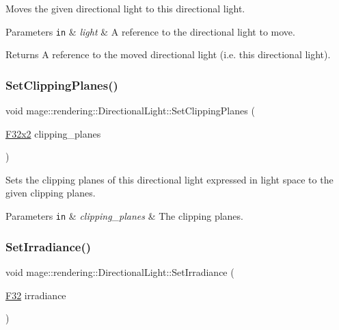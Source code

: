 Moves the given directional light to this directional light.


\begin{DoxyParams}[1]{Parameters}
\mbox{\tt in}  & {\em light} & A reference to the directional light to move. \\
\hline
\end{DoxyParams}
\begin{DoxyReturn}{Returns}
A reference to the moved directional light (i.\+e. this directional light). 
\end{DoxyReturn}
\mbox{\label{classmage_1_1rendering_1_1_directional_light_ae90562c217d876a3a2a73f36f36a700f}} 
\subsubsection{\texorpdfstring{Set\+Clipping\+Planes()}{SetClippingPlanes()}}
{\footnotesize\ttfamily void mage\+::rendering\+::\+Directional\+Light\+::\+Set\+Clipping\+Planes (\begin{DoxyParamCaption}\item[{\mbox{\hyperlink{namespacemage_a9dc0d34d6ecc87e4cfa4a826102117bc}{F32x2}}}]{clipping\+\_\+planes }\end{DoxyParamCaption})\hspace{0.3cm}{\ttfamily [noexcept]}}

Sets the clipping planes of this directional light expressed in light space to the given clipping planes.


\begin{DoxyParams}[1]{Parameters}
\mbox{\tt in}  & {\em clipping\+\_\+planes} & The clipping planes. \\
\hline
\end{DoxyParams}
\mbox{\label{classmage_1_1rendering_1_1_directional_light_af8570b18bfb807492317e4a98f5c7ba6}} 
\subsubsection{\texorpdfstring{Set\+Irradiance()}{SetIrradiance()}}
{\footnotesize\ttfamily void mage\+::rendering\+::\+Directional\+Light\+::\+Set\+Irradiance (\begin{DoxyParamCaption}\item[{\mbox{\hyperlink{namespacemage_aa97e833b45f06d60a0a9c4fc22ae02c0}{F32}}}]{irradiance }\end{DoxyParamCaption})\hspace{0.3cm}{\ttfamily [noexcept]}}

